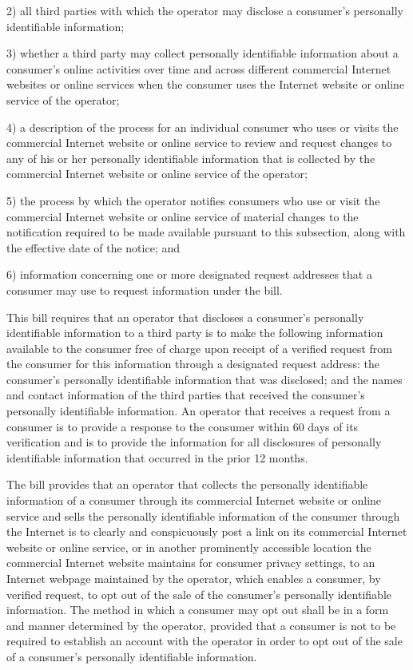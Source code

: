      2)    all third parties with which the operator may disclose a consumer's personally identifiable information;

     3)    whether a third party may collect personally identifiable information about a consumer's online activities over time and across different commercial Internet websites or online services when the consumer uses the Internet website or online service of the operator;

     4)    a description of the process for an individual consumer who uses or visits the commercial Internet website or online service to review and request changes to any of his or her personally identifiable information that is collected by the commercial Internet website or online service of the operator;

     5)    the process by which the operator notifies consumers who use or visit the commercial Internet website or online service of material changes to the notification required to be made available pursuant to this subsection, along with the effective date of the notice; and

     6)    information concerning one or more designated request addresses that a consumer may use to request information under the bill.

     This bill requires that an operator that discloses a consumer's personally identifiable information to a third party is to make the following information available to the consumer free of charge upon receipt of a verified request from the consumer for this information through a designated request address: the consumer's personally identifiable information that was disclosed; and the names and contact information of the third parties that received the consumer's personally identifiable information. An operator that receives a request from a consumer is to provide a response to the consumer within 60 days of its verification and is to provide the information for all disclosures of personally identifiable information that occurred in the prior 12 months.

     The bill provides that an operator that collects the personally identifiable information of a consumer through its commercial Internet website or online service and sells the personally identifiable information of the consumer through the Internet is to clearly and conspicuously post a link on its commercial Internet website or online service, or in another prominently accessible location the commercial Internet website maintains for consumer privacy settings, to an Internet webpage maintained by the operator, which enables a consumer, by verified request, to opt out of the sale of the consumer's personally identifiable information. The method in which a consumer may opt out shall be in a form and manner determined by the operator, provided that a consumer is not to be required to establish an account with the operator in order to opt out of the sale of a consumer's personally identifiable information.

